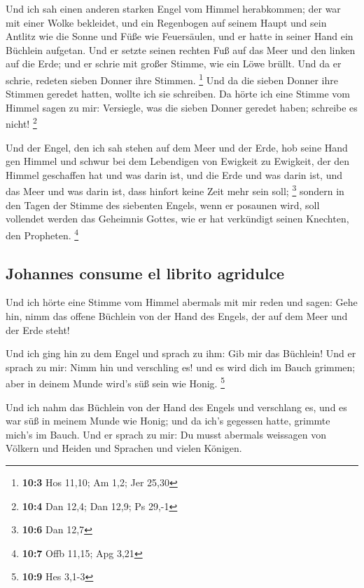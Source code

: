  Und ich sah einen anderen starken Engel vom Himmel
herabkommen; der war mit einer Wolke bekleidet, und ein Regenbogen auf
seinem Haupt und sein Antlitz wie die Sonne und Füße wie Feuersäulen,
 und er hatte in seiner Hand ein Büchlein aufgetan. Und er
setzte seinen rechten Fuß auf das Meer und den linken auf die Erde;
 und er schrie mit großer Stimme, wie ein Löwe brüllt. Und
da er schrie, redeten sieben Donner ihre Stimmen. \footnote{\textbf{10:3}
  Hos 11,10; Am 1,2; Jer 25,30}  Und da die sieben Donner
ihre Stimmen geredet hatten, wollte ich sie schreiben. Da hörte ich eine
Stimme vom Himmel sagen zu mir: Versiegle, was die sieben Donner geredet
haben; schreibe es nicht! \footnote{\textbf{10:4} Dan 12,4; Dan 12,9; Ps
  29,-1}

 Und der Engel, den ich sah stehen auf dem Meer und der
Erde, hob seine Hand gen Himmel  und schwur bei dem
Lebendigen von Ewigkeit zu Ewigkeit, der den Himmel geschaffen hat und
was darin ist, und die Erde und was darin ist, und das Meer und was
darin ist, dass hinfort keine Zeit mehr sein soll; \footnote{\textbf{10:6}
  Dan 12,7}  sondern in den Tagen der Stimme des siebenten
Engels, wenn er posaunen wird, soll vollendet werden das Geheimnis
Gottes, wie er hat verkündigt seinen Knechten, den Propheten.
\footnote{\textbf{10:7} Offb 11,15; Apg 3,21}

\hypertarget{johannes-consume-el-librito-agridulce}{%
\subsection{Johannes consume el librito
agridulce}\label{johannes-consume-el-librito-agridulce}}

 Und ich hörte eine Stimme vom Himmel abermals mit mir
reden und sagen: Gehe hin, nimm das offene Büchlein von der Hand des
Engels, der auf dem Meer und der Erde steht!

 Und ich ging hin zu dem Engel und sprach zu ihm: Gib mir
das Büchlein! Und er sprach zu mir: Nimm hin und verschling es! und es
wird dich im Bauch grimmen; aber in deinem Munde wird's süß sein wie
Honig. \footnote{\textbf{10:9} Hes 3,1-3}

 Und ich nahm das Büchlein von der Hand des Engels und
verschlang es, und es war süß in meinem Munde wie Honig; und da ich's
gegessen hatte, grimmte mich's im Bauch.  Und er sprach
zu mir: Du musst abermals weissagen von Völkern und Heiden und Sprachen
und vielen Königen.

